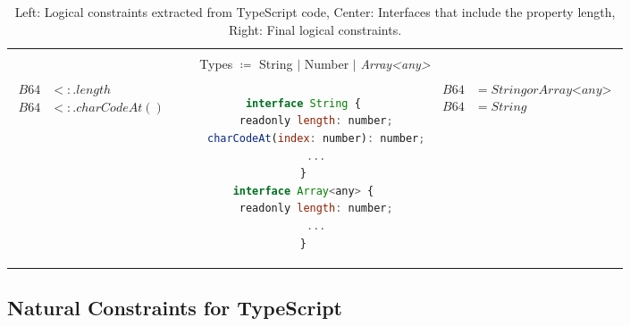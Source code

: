 \documentclass[acmsmall, review, anonymous]{acmart}\settopmatter{printfolios=true,printccs=false,printacmref=false}
\begin{document}
\begin{table*}[t]
    \centering
    \caption{Left: Logical constraints extracted from TypeScript code,
    Center: Interfaces that include the property length,
    Right: Final logical constraints.}\label{fig:log-base64a}
    \begin{tabular}{ccc}
        \toprule\\
        \multicolumn{3}{c}{Types $\coloneqq$ String $\mathbin{|}$ Number $\mathbin{|}$ \textit{Array<any>}}\\
        \midrule\\
        \begin{minipage}{0.25\textwidth}
            {\begin{align*}
                B64 & <: .length\\
                B64 & <: .charCodeAt()
            \end{align*}}
        \end{minipage} &
        \begin{minipage}{0.35\textwidth}
{\begin{lstlisting}[language=JavaScript,numbers=none]
interface String {
    readonly length: number;
    charCodeAt(index: number): number;
    ...
}
interface Array<any> {
    readonly length: number;
    ...
}
\end{lstlisting}}
        \end{minipage} &
        \begin{minipage}{0.3\textwidth}
            {\begin{align*}
                B64 & = String \mathbin{or} \textit{Array<any>}\\
                B64 & = String
            \end{align*}}
        \end{minipage}\\
        \bottomrule
    \end{tabular}
\end{table*}

\subsection{Natural Constraints for TypeScript}\label{ssec:natprodts}
\end{document}
